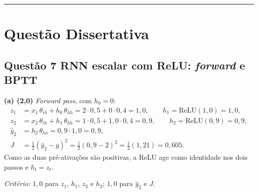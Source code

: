 \documentclass[11pt,a4paper]{article}
\begin{document}
\color{black}
\rule{\linewidth}{0.4pt}

\section*{Questão Dissertativa}

\color{blue}

\subsection*{Questão 7 \textemdash{} RNN escalar com ReLU: \textit{forward} e BPTT}

\textbf{(a) (2{,}0)} \textit{Forward pass}, com $h_0 = 0$:
\begin{align*}
    z_1 &= x_1\,\theta_{ih} + h_0\,\theta_{hh} = 2 \cdot 0{,}5 + 0 \cdot 0{,}4 = 1{,}0, \qquad h_1 = \mathrm{ReLU}(1{,}0) = 1{,}0, \\
    z_2 &= x_2\,\theta_{ih} + h_1\,\theta_{hh} = 1 \cdot 0{,}5 + 1{,}0 \cdot 0{,}4 = 0{,}9, \qquad h_2 = \mathrm{ReLU}(0{,}9) = 0{,}9, \\
    \hat{y}_2 &= h_2\,\theta_{ho} = 0{,}9 \cdot 1{,}0 = 0{,}9, \\
    J &= \tfrac{1}{2}(\hat{y}_2 - y)^2 = \tfrac{1}{2}(0{,}9 - 2)^2 = \tfrac{1}{2}(1{,}21) = 0{,}605.
\end{align*}
Como as duas pré-ativações são positivas, a ReLU age como identidade nos dois passos e $h_t = z_t$.

\textit{Critério:} $1{,}0$ para $z_1$, $h_1$, $z_2$ e $h_2$; $1{,}0$ para $\hat{y}_2$ e $J$.
\end{document}
